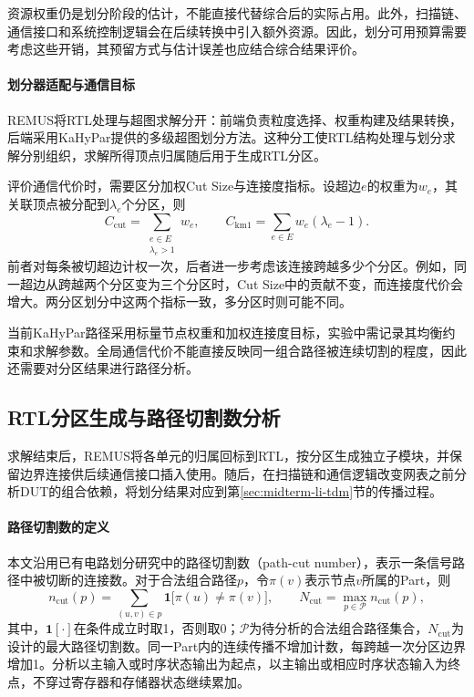 资源权重仍是划分阶段的估计，不能直接代替综合后的实际占用。此外，扫描链、通信接口和系统控制逻辑会在后续转换中引入额外资源。因此，划分可用预算需要考虑这些开销，其预留方式与估计误差也应结合综合结果评价。


\paragraph{划分器适配与通信目标}

REMUS将RTL处理与超图求解分开：前端负责粒度选择、权重构建及结果转换，后端采用KaHyPar提供的多级超图划分方法\cite{schlag_high_quality_2022}。这种分工使RTL结构处理与划分求解分别组织，求解所得顶点归属随后用于生成RTL分区。

评价通信代价时，需要区分加权Cut Size与连接度指标。设超边$e$的权重为$w_e$，其关联顶点被分配到$\lambda_e$个分区，则
\begin{equation}
    C_{\mathrm{cut}}=\sum_{\substack{e\in E\\\lambda_e>1}}w_e,
    \qquad
    C_{\mathrm{km1}}=\sum_{e\in E}w_e(\lambda_e-1).
    \label{eq:midterm-hypergraph-cost}
\end{equation}
前者对每条被切超边计权一次，后者进一步考虑该连接跨越多少个分区。例如，同一超边从跨越两个分区变为三个分区时，Cut Size中的贡献不变，而连接度代价会增大。两分区划分中这两个指标一致，多分区时则可能不同。

当前KaHyPar路径采用标量节点权重和加权连接度目标，实验中需记录其均衡约束和求解参数。全局通信代价不能直接反映同一组合路径被连续切割的程度，因此还需要对分区结果进行路径分析。

\subsection{RTL分区生成与路径切割数分析}
\label{sec:midterm-path-cut}

求解结束后，REMUS将各单元的归属回标到RTL，按分区生成独立子模块，并保留边界连接供后续通信接口插入使用。随后，在扫描链和通信逻辑改变网表之前分析DUT的组合依赖，将划分结果对应到第\ref{sec:midterm-li-tdm}节的传播过程。

\paragraph{路径切割数的定义}

本文沿用已有电路划分研究中的路径切割数（path-cut number），表示一条信号路径中被切断的连接数\cite{sait_evolutionary_2002}。对于合法组合路径$p$，令$\pi(v)$表示节点$v$所属的Part，则
\begin{equation}
    n_{\mathrm{cut}}(p)
    =\sum_{(u,v)\in p}\mathbf{1}\bigl[\pi(u)\ne\pi(v)\bigr],
    \qquad
    N_{\mathrm{cut}}=\max_{p\in\mathcal{P}}n_{\mathrm{cut}}(p),
    \label{eq:midterm-path-cut}
\end{equation}
其中，$\mathbf{1}[\cdot]$在条件成立时取1，否则取0；$\mathcal{P}$为待分析的合法组合路径集合，$N_{\mathrm{cut}}$为设计的最大路径切割数。同一Part内的连续传播不增加计数，每跨越一次分区边界增加1。分析以主输入或时序状态输出为起点，以主输出或相应时序状态输入为终点，不穿过寄存器和存储器状态继续累加。

